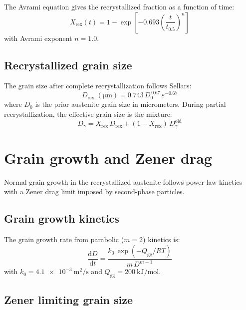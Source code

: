 \documentclass[11pt,a4paper]{article}
\newcommand{\DG}{\ensuremath{D_\gamma}}
\newcommand{\Xrex}{\ensuremath{X_\mathrm{rex}}}
\begin{document}
The Avrami equation gives the recrystallized fraction as a function of time:
\begin{equation}
  \Xrex(t) = 1 - \exp\!\left[-0.693\left(\frac{t}{t_{0.5}}\right)^{\!n}\right]
  \label{eq:jmak}
\end{equation}
with Avrami exponent $n = 1.0$.

\subsection{Recrystallized grain size}

The grain size after complete recrystallization follows Sellars:
\begin{equation}
  D_\mathrm{rex}\;(\si{\micro\metre})
    = 0.743\,D_0^{\,0.67}\,\varepsilon^{-0.67}
  \label{eq:drex}
\end{equation}
where $D_0$ is the prior austenite grain size in micrometers.  During partial
recrystallization, the effective grain size is the mixture:
\begin{equation}
  \DG = \Xrex\,D_\mathrm{rex} + (1 - \Xrex)\,D_\gamma^\mathrm{old}
  \label{eq:dmix}
\end{equation}

\section{Grain growth and Zener drag}
\label{sec:gg}

Normal grain growth in the recrystallized austenite follows power-law kinetics
with a Zener drag limit imposed by second-phase particles.

\subsection{Grain growth kinetics}

The grain growth rate from parabolic ($m = 2$) kinetics is:
\begin{equation}
  \frac{\mathrm{d}D}{\mathrm{d}t}
    = \frac{k_0\,\exp(-Q_\mathrm{gg}/RT)}{m\,D^{m-1}}
  \label{eq:gg}
\end{equation}
with $k_0 = \SI{4.1e-3}{\metre\squared\per\second}$ and
$Q_\mathrm{gg} = \SI{200}{\kilo\joule\per\mole}$.

\subsection{Zener limiting grain size}
\end{document}
